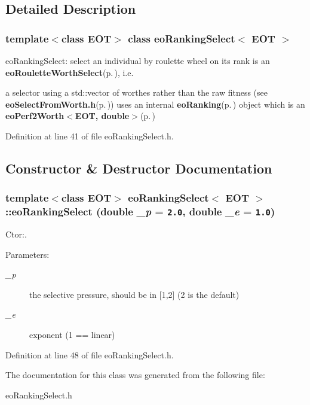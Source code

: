 \subsection{Detailed Description}
\subsubsection*{template$<$class EOT$>$ class eo\-Ranking\-Select$<$ EOT $>$}

eo\-Ranking\-Select: select an individual by roulette wheel on its rank is an {\bf eo\-Roulette\-Worth\-Select}{\rm (p.\,\pageref{classeo_roulette_worth_select})}, i.e. 

a selector using a std::vector of worthes rather than the raw fitness (see {\bf eo\-Select\-From\-Worth.h}{\rm (p.\,\pageref{eo_select_from_worth_8h})}) uses an internal {\bf eo\-Ranking}{\rm (p.\,\pageref{classeo_ranking})} object which is an {\bf eo\-Perf2Worth$<$EOT, double$>$}{\rm (p.\,\pageref{classeo_perf2_worth})} 



Definition at line 41 of file eo\-Ranking\-Select.h.

\subsection{Constructor \& Destructor Documentation}
\subsubsection{\setlength{\rightskip}{0pt plus 5cm}template$<$class EOT$>$ {\bf eo\-Ranking\-Select}$<$ {\bf EOT} $>$::{\bf eo\-Ranking\-Select} (double {\em \_\-p} = {\tt 2.0}, double {\em \_\-e} = {\tt 1.0})\hspace{0.3cm}{\tt  [inline]}}\label{classeo_ranking_select_a0}


Ctor:. 

\begin{Desc}
\item[Parameters:]
\begin{description}
\item[{\em \_\-p}]the selective pressure, should be in [1,2] (2 is the default) \item[{\em \_\-e}]exponent (1 == linear) \end{description}
\end{Desc}


Definition at line 48 of file eo\-Ranking\-Select.h.

The documentation for this class was generated from the following file:\begin{CompactItemize}
\item 
eo\-Ranking\-Select.h\end{CompactItemize}
